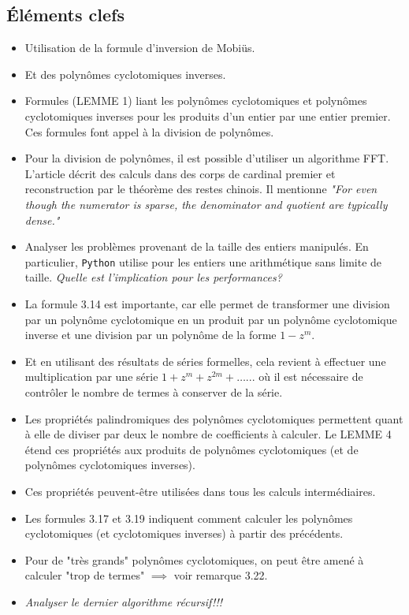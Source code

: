 \documentclass{article}
\theoremstyle{break}                  %
\begin{document}
\subsection*{Éléments clefs}
\begin{itemize}
	\item Utilisation de la formule d'inversion de Mobiüs.
	\item Et des polynômes cyclotomiques inverses.
	\item Formules (LEMME 1) liant les polynômes cyclotomiques et polynômes cyclotomiques inverses pour les produits d'un entier par une entier premier. Ces formules font appel à la division de polynômes.
	\item Pour la division de polynômes, il est possible d'utiliser un algorithme FFT. L'article décrit des calculs dans des corps de cardinal premier et reconstruction par le théorème des restes chinois. Il mentionne \textit{"For even though the numerator is sparse, the denominator and quotient are typically dense."}
	\item Analyser les problèmes provenant de la taille des entiers manipulés. En particulier, \texttt{Python} utilise pour les entiers une arithmétique sans limite de taille. \textit{Quelle est l'implication pour les performances?}
	\item La formule 3.14 est importante, car elle permet de transformer une division par un polynôme cyclotomique en un produit par un polynôme cyclotomique inverse et une division par un polynôme de la forme $1 - z^m$.
	\item Et en utilisant des résultats de séries formelles, cela revient à effectuer une multiplication par une série $1 + z^m + z^{2m} + \dots$... où il est nécessaire de contrôler le nombre de termes à conserver de la série.
	\item Les propriétés palindromiques des polynômes cyclotomiques permettent quant à elle de diviser par deux le nombre de coefficients à calculer. Le LEMME 4 étend ces propriétés aux produits de polynômes cyclotomiques (et de polynômes cyclotomiques inverses).
	\item Ces propriétés peuvent-être utilisées dans tous les calculs intermédiaires.
	\item Les formules 3.17 et 3.19 indiquent comment calculer les polynômes cyclotomiques (et cyclotomiques inverses) à partir des précédents.
	\item Pour de "très grands" polynômes cyclotomiques, on peut être amené à calculer "trop de termes" $\implies$ voir remarque 3.22.
	\item \textit{Analyser le dernier algorithme récursif!!!}
\end{itemize}
\end{document}
